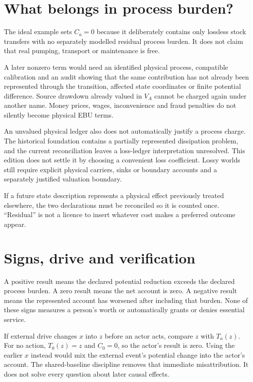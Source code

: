 \section{What belongs in process burden?}
The ideal example sets $C_a=0$ because it deliberately contains only lossless stock transfers with no separately modelled residual process burden. It does not claim that real pumping, transport or maintenance is free.

A later nonzero term would need an identified physical process, compatible calibration and an audit showing that the same contribution has not already been represented through the transition, affected state coordinates or finite potential difference. Source drawdown already valued in $V_A$ cannot be charged again under another name. Money prices, wages, inconvenience and fraud penalties do not silently become physical EBU terms.

An unvalued physical ledger also does not automatically justify a process charge. The historical foundation contains a partially represented dissipation problem, and the current reconciliation leaves a loss-ledger interpretation unresolved. This edition does not settle it by choosing a convenient loss coefficient. Lossy worlds still require explicit physical carriers, sinks or boundary accounts and a separately justified valuation boundary.

If a future state description represents a physical effect previously treated elsewhere, the two declarations must be reconciled so it is counted once. ``Residual'' is not a licence to insert whatever cost makes a preferred outcome appear.

\section{Signs, drive and verification}
A positive result means the declared potential reduction exceeds the declared process burden. A zero result means the net account is zero. A negative result means the represented account has worsened after including that burden. None of these signs measures a person's worth or automatically grants or denies essential service.

If external drive changes $x$ into $z$ before an actor acts, compare $z$ with $T_a(z)$. For no action, $T_0(z)=z$ and $C_0=0$, so the actor's result is zero. Using the earlier $x$ instead would mix the external event's potential change into the actor's account. The shared-baseline discipline removes that immediate misattribution. It does not solve every question about later causal effects.\cite{foundation}

